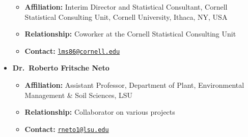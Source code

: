 \documentclass[11pt,a4paper,]{moderncv}
\providecommand{\tightlist}{%
	\setlength{\itemsep}{0pt}\setlength{\parskip}{0pt}}
\begin{document}
\begin{itemize}
  \begin{itemize}
  \tightlist
  \item
    \textbf{Affiliation:} Interim Director and Statistical Consultant,
    Cornell Statistical Consulting Unit, Cornell University, Ithaca, NY,
    USA
  \item
    \textbf{Relationship:} Coworker at the Cornell Statistical
    Consulting Unit
  \item
    \textbf{Contact:}
    \href{mailto:lms86@cornell.edu}{\nolinkurl{lms86@cornell.edu}}
  \end{itemize}
\item
  \textbf{Dr.~Roberto Fritsche Neto}

  \begin{itemize}
  \tightlist
  \item
    \textbf{Affiliation:} Assistant Professor, Department of Plant,
    Environmental Management \& Soil Sciences, LSU
  \item
    \textbf{Relationship:} Collaborator on various projects
  \item
    \textbf{Contact:}
    \href{mailto:rneto1@lsu.edu}{\nolinkurl{rneto1@lsu.edu}}
  \end{itemize}
\end{itemize}
\end{document}
